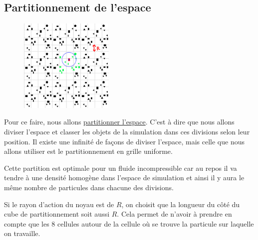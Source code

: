 \documentclass[a4paper,10pt]{report}
\begin{document}
\subsection{Partitionnement de l'espace}
\begin{figure}
 \includegraphics[width=0.4\textwidth]{big_uniform_grid_partitionning}
\end{figure}
Pour ce faire, nous allons \href{https://en.wikipedia.org/wiki/Space_partitioning}{partitionner l'espace}. C'est à dire que nous allons diviser l'espace et classer les objets de la simulation dans ces divisions selon leur position. Il existe une infinité de façons de diviser l'espace, mais celle que nous allons utiliser est le partitionnement en grille uniforme.

Cette partition est optimale pour un fluide incompressible car au repos il va tendre à une densité homogène dans l'espace de simulation et ainsi il y aura le même nombre de particules dans chacune des divisions.

Si le rayon d'action du noyau est de $R$, on choisit que la longueur du côté du cube de partitionnement soit aussi $R$. Cela permet de n'avoir à prendre en compte que les 8 cellules autour de la cellule où se trouve la particule sur laquelle on travaille.
\end{document}
